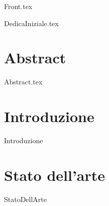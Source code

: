 \documentclass[12pt,onesidet]{report}
\begin{document}
	
	\begin{titlepage}
		{Front.tex}
	\end{titlepage}

	{DedicaIniziale.tex}
    
    
    \chapter*{Abstract}
    {Abstract.tex}
    
    \tableofcontents{}
    \listoftables
    \listoflistings
    \newpage
    
    
    \chapter{Introduzione}
    {Introduzione}
    
    \chapter{Stato dell'arte}
    {StatoDellArte}
    
     
    
    
\end{document}
